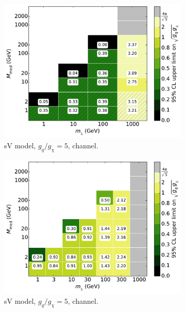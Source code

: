 \begin{figure}
  \centering
  \begin{subfigure}[t]{0.32\textwidth}
    \centering
    \includegraphics[width=1.\textwidth]{figures/grid_basepoints_SVD_rat5_monojet.pdf}
    \caption{sV model, $g_q/g_{\chi} = 5$, \monojet channel.}
  \end{subfigure}
  \begin{subfigure}[t]{0.32\textwidth}
    \centering
    \includegraphics[width=1.\textwidth]{figures/grid_allpoints_SVD_rat5.pdf}
    \caption{sV model, $g_q/g_{\chi} = 5$, \monoZ channel.}
  \end{subfigure}
  \begin{subfigure}[t]{0.32\textwidth}

\end{subfigure}
\end{figure}
